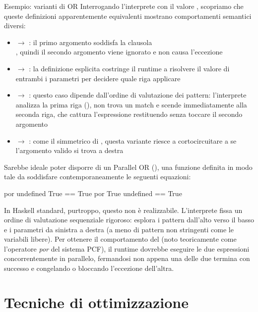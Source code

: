 \begin{gframe}{Esempio: varianti di OR}
Interrogando l'interprete con il valore , scopriamo che queste definizioni apparentemente equivalenti mostrano comportamenti semantici diversi:
\begin{itemize}
    \item {} $\rightarrow$ : il primo argomento soddisfa la clausola
        \\ , quindi il secondo argomento viene ignorato e non causa l'eccezione
    \item {} $\rightarrow$ : la definizione esplicita costringe il runtime a risolvere il valore di entrambi i parametri per decidere quale riga applicare
    \item {} $\rightarrow$ : questo caso dipende dall'ordine di valutazione dei pattern: l'interprete analizza la prima riga (), non trova un match e scende immediatamente alla seconda riga, che cattura l'espressione restituendo  senza toccare il secondo argomento
    \item {} $\rightarrow$ : come il simmetrico di , questa variante riesce a cortocircuitare a  se l'argomento valido si trova a destra
\end{itemize}

Sarebbe ideale poter disporre di un Parallel OR (), una funzione definita in modo tale da soddisfare contemporaneamente le seguenti equazioni:
\begin{haskellbox}{}
por undefined True == True
por True undefined == True
\end{haskellbox}

In Haskell standard, purtroppo, questo non è realizzabile. L'interprete fissa un ordine di valutazione sequenziale rigoroso: esplora i pattern dall'alto verso il basso e i parametri da sinistra a destra (a meno di pattern non stringenti come le variabili libere). Per ottenere il comportamento del  (noto teoricamente come l'operatore \textit{por} del sistema PCF), il runtime dovrebbe eseguire le due espressioni concorrentemente in parallelo, fermandosi non appena una delle due termina con successo e congelando o bloccando l'eccezione dell'altra.
\end{gframe}

\section{Tecniche di ottimizzazione}

